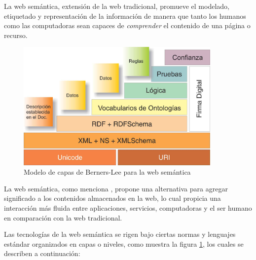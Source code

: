 La web sem\'antica, extensi\'on de la web tradicional, promueve el modelado, etiquetado y representaci\'on de la informaci\'on de manera que tanto los humanos como las computadoras sean capaces de \textit{comprender} el contenido de una p\'agina o recurso.

\begin{figure}[!ht]
    \centering
    \includegraphics[width=10cm]{figures/ModeloCapasWebSemantica.jpg} %
    \caption{Modelo de capas de Berners-Lee para la web sem\'antica\cite{WebSemantica_SciELO}} %
    \label{Modelo_Web_Semantica}
\end{figure}

La web sem\'antica, como menciona \cite{IntroBD_RDF}, propone una alternativa para agregar significado a los contenidos almacenados en la web, lo cual propicia una interacci\'on m\'as fluida entre aplicaciones, servicios, computadoras y el ser humano en comparaci\'on con la web tradicional. 

Las tecnolog\'ias de la web sem\'antica se rigen bajo ciertas normas y lenguajes est\'andar organizados en capas o niveles, como muestra la figura \ref{Modelo_Web_Semantica}, los cuales se describen a continuaci\'on: \cite{IntroBD_RDF}

